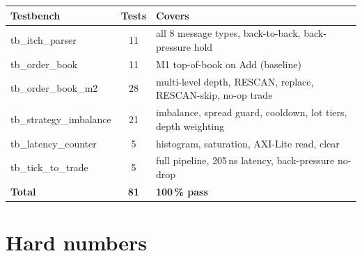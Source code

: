 \documentclass[10pt,a4paper]{article}
\begin{document}
\begin{center}
\renewcommand{\arraystretch}{1.12}
\begin{tabular}{@{}l c l@{}}
\toprule
\textbf{Testbench} & \textbf{Tests} & \textbf{Covers} \\
\midrule
tb\_itch\_parser        & 11 & all 8 message types, back-to-back, back-pressure hold \\
tb\_order\_book         & 11 & M1 top-of-book on Add (baseline) \\
tb\_order\_book\_m2     & 28 & multi-level depth, RESCAN, replace, RESCAN-skip, no-op trade \\
tb\_strategy\_imbalance & 21 & imbalance, spread guard, cooldown, lot tiers, depth weighting \\
tb\_latency\_counter    &  5 & histogram, saturation, AXI-Lite read, clear \\
tb\_tick\_to\_trade     &  5 & full pipeline, 205\,ns latency, back-pressure no-drop \\
\midrule
\textbf{Total}          & \textbf{81} & \textbf{100\,\% pass} \\
\bottomrule
\end{tabular}
\end{center}

\section{Hard numbers}
\end{document}
